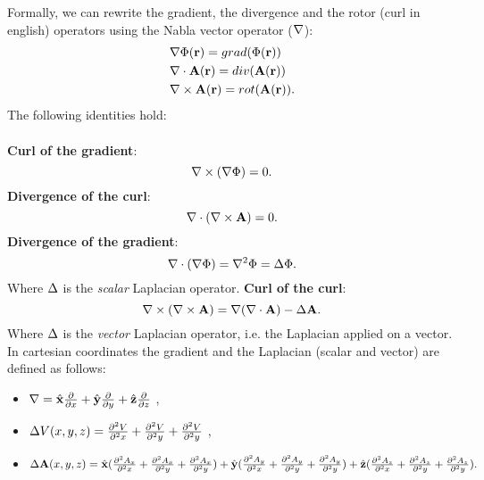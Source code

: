 \documentclass[11pt,a4paper]{report}
\def\Nabla{\ensuremath\bm{\nabla}}
\def\bm{\ensuremath\mathbf}
\def\curl{\ensuremath\Nabla\times}
\def\div{\ensuremath\Nabla\cdot}
\def\lap{\ensuremath\Delta}
\def\vlap{\ensuremath\Delta}
\def\x{\ensuremath\hat{\bm{x}}}
\def\y{\ensuremath\hat{\bm{y}}}
\def\z{\ensuremath\hat{\bm{z}}}
\begin{document}
Formally, we can rewrite the gradient, the divergence and the rotor (curl in english) operators using the Nabla vector operator ($\Nabla$):
\begin{align*}
  & \Nabla \Phi(\bm{r})  = grad (\Phi( \bm{r} )) \\
  & \div \bm{A}(\bm{r}) = div (\bm{A}(\bm{r})) \\ 
  & \curl \bm{A}(\bm{r}) = rot (\bm{A}( \bm{r} )).
\end{align*}
The following identities hold:\\\\
\textbf{Curl of the gradient}:
\begin{equation}
  \label{eq:curlofgradient}
  \curl (\Nabla\Phi) = 0 .
\end{equation}
\textbf{Divergence of the curl}:
\begin{equation}
  \label{eq:divergenceofcurl}
  \div (\curl \bm{A}) = 0 .
\end{equation}
\textbf{Divergence of the gradient}:
\begin{equation}
  \label{eq:divergenceofgradient}
  \div (\Nabla \Phi) = \Nabla^2 \Phi = \lap \Phi.
\end{equation}
Where $\lap$ is the \emph{scalar} Laplacian operator. 
\textbf{Curl of the curl}:
\begin{equation}
  \label{eq:curlofcurl}
  \curl (\curl \bm{A}) = \Nabla (\div \bm{A})-\vlap \bm{A}. 
\end{equation}
Where $\vlap$ is the \emph{vector} Laplacian operator, i.e. the Laplacian applied on a vector. 
\\

In cartesian coordinates the gradient and the Laplacian (scalar and vector) are defined as follows: 
\begin{itemize}
  \item $\Nabla = \x \frac{\partial}{\partial x} + \y \frac{\partial}{\partial y}+\z\frac{\partial}{\partial z}$ ,
  \item $\lap V(x,y,z) = \frac{\partial^2 V}{\partial^2 x}+\frac{\partial^2 V}{\partial^2 y} +\frac{\partial^2 V}{\partial^2 y}$ ,
  \item $\vlap \bm{A}(x,y,z) =\x ( \frac{\partial^2 A_x}{\partial^2 x}+\frac{\partial^2 A_x}{\partial^2 y} +\frac{\partial^2 A_x}{\partial^2 y}) + \y(\frac{\partial^2 A_y}{\partial^2 x}+\frac{\partial^2 A_y}{\partial^2 y} +\frac{\partial^2 A_y}{\partial^2 y})+\z(\frac{\partial^2 A_z}{\partial^2 x}+\frac{\partial^2 A_z}{\partial^2 y} +\frac{\partial^2 A_z}{\partial^2 y}).$
\end{itemize}
\end{document}
